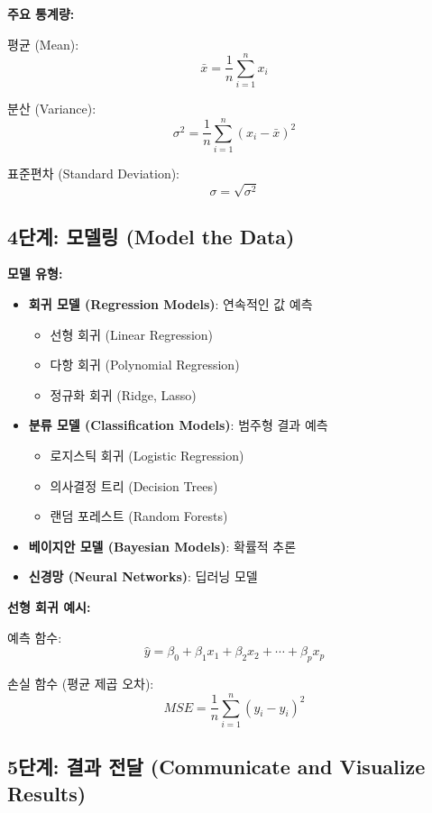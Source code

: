 \documentclass[12pt,a4paper]{article}
\begin{document}
\textbf{주요 통계량:}

평균 (Mean):
\[
\bar{x} = \frac{1}{n}\sum_{i=1}^{n} x_i
\]

분산 (Variance):
\[
\sigma^2 = \frac{1}{n}\sum_{i=1}^{n} (x_i - \bar{x})^2
\]

표준편차 (Standard Deviation):
\[
\sigma = \sqrt{\sigma^2}
\]

\subsection{4단계: 모델링 (Model the Data)}

\textbf{모델 유형:}

\begin{itemize}
    \item \textbf{회귀 모델 (Regression Models)}: 연속적인 값 예측
    \begin{itemize}
        \item 선형 회귀 (Linear Regression)
        \item 다항 회귀 (Polynomial Regression)
        \item 정규화 회귀 (Ridge, Lasso)
    \end{itemize}

    \item \textbf{분류 모델 (Classification Models)}: 범주형 결과 예측
    \begin{itemize}
        \item 로지스틱 회귀 (Logistic Regression)
        \item 의사결정 트리 (Decision Trees)
        \item 랜덤 포레스트 (Random Forests)
    \end{itemize}

    \item \textbf{베이지안 모델 (Bayesian Models)}: 확률적 추론
    \item \textbf{신경망 (Neural Networks)}: 딥러닝 모델
\end{itemize}

\textbf{선형 회귀 예시:}

예측 함수:
\[
\hat{y} = \beta_0 + \beta_1 x_1 + \beta_2 x_2 + \cdots + \beta_p x_p
\]

손실 함수 (평균 제곱 오차):
\[
MSE = \frac{1}{n}\sum_{i=1}^{n} (y_i - \hat{y}_i)^2
\]

\subsection{5단계: 결과 전달 (Communicate and Visualize Results)}
\end{document}
